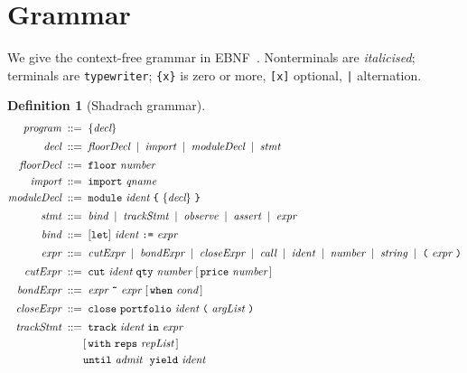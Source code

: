 \documentclass[11pt,a4paper]{article}
\theoremstyle{thmstyle}
\theoremstyle{definition}
\newtheorem{definition}[theorem]{Definition}
\theoremstyle{remark}
\newcommand{\bnf}{\;::=\;}
\newcommand{\alt}{\;\mid\;}
\newcommand{\sh}[1]{\texttt{#1}}
\begin{document}
\section{Grammar}
\label{sec:grammar}

We give the context-free grammar in EBNF~\citep{ebnf2017}. Nonterminals
are \textit{italicised}; terminals are \sh{typewriter}; \sh{\{x\}} is
zero or more, \sh{[x]} optional, \sh{|} alternation.

\begin{definition}[Shadrach grammar]
\label{def:grammar}
\begin{align*}
\textit{program} &\bnf \{\textit{decl}\} \\[2pt]
\textit{decl} &\bnf \textit{floorDecl} \alt \textit{import}
   \alt \textit{moduleDecl} \alt \textit{stmt} \\[2pt]
\textit{floorDecl} &\bnf \sh{floor}\ \textit{number} \\
\textit{import} &\bnf \sh{import}\ \textit{qname} \\
\textit{moduleDecl} &\bnf \sh{module}\ \textit{ident}\ \sh{\{}\ \{\textit{decl}\}\ \sh{\}} \\[2pt]
\textit{stmt} &\bnf \textit{bind} \alt \textit{trackStmt} \alt \textit{observe}
   \alt \textit{assert} \alt \textit{expr} \\[2pt]
\textit{bind} &\bnf [\sh{let}]\ \textit{ident}\ \sh{:=}\ \textit{expr} \\[2pt]
\textit{expr} &\bnf \textit{cutExpr} \alt \textit{bondExpr}
   \alt \textit{closeExpr} \alt \textit{call} \alt \textit{ident}
   \alt \textit{number} \alt \textit{string}
   \alt \sh{(}\ \textit{expr}\ \sh{)} \\[2pt]
\textit{cutExpr} &\bnf \sh{cut}\ \textit{ident}\ \sh{qty}\ \textit{number}\
   [\,\sh{price}\ \textit{number}\,] \\[2pt]
\textit{bondExpr} &\bnf \textit{expr}\ \sh{\~{}}\ \textit{expr}\
   [\,\sh{when}\ \textit{cond}\,] \\[2pt]
\textit{closeExpr} &\bnf \sh{close}\ \sh{portfolio}\ \textit{ident}\ \sh{(}\
   \textit{argList}\ \sh{)} \\[2pt]
\textit{trackStmt} &\bnf \sh{track}\ \textit{ident}\ \sh{in}\ \textit{expr} \\
   &\qquad [\,\sh{with}\ \sh{reps}\ \textit{repList}\,]\ \\
   &\qquad \sh{until}\ \textit{admit}\ \ \sh{yield}\ \textit{ident} \\[2pt]

\end{align*}
\end{definition}
\end{document}

